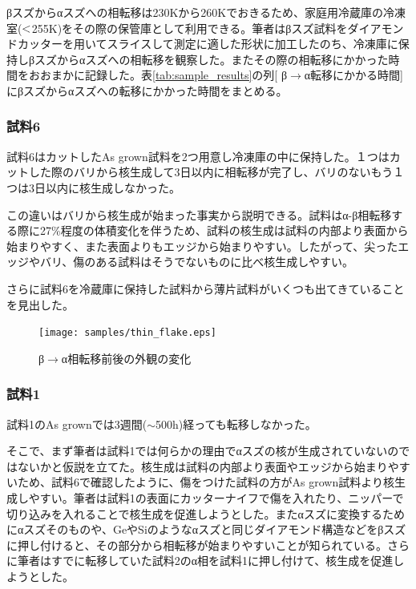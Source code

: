 βスズからαスズへの相転移は230Kから260Kでおきる\cite{Matvienko,Ogino,Cornelius}ため、家庭用冷蔵庫の冷凍室($\rm<$255K)をその際の保管庫として利用できる。筆者はβスズ試料をダイアモンドカッターを用いてスライスして測定に適した形状に加工したのち、冷凍庫に保持しβスズからαスズへの相転移を観察した。またその際の相転移にかかった時間をおおまかに記録した。表\ref{tab:sample_results}の列[ β$\to$α転移にかかる時間] にβスズからαスズへの転移にかかった時間をまとめる。

\subsubsection{試料6}
試料6はカットしたAs grown試料を2つ用意し冷凍庫の中に保持した。１つはカットした際のバリから核生成して3日以内に相転移が完了し、バリのないもう１つは3日以内に核生成しなかった。

この違いはバリから核生成が始まった事実から説明できる。試料はα-β相転移する際に27\%程度の体積変化を伴うため、試料の核生成は試料の内部より表面から始まりやすく、また表面よりもエッジから始まりやすい\cite{Cornelius}。したがって、尖ったエッジやバリ、傷のある試料はそうでないものに比べ核生成しやすい。

さらに試料6を冷蔵庫に保持した試料から薄片試料がいくつも出てきていることを見出した。
\begin{figure}[!h]
    \begin{center}
   \texttt{[image: samples/thin\_flake.eps]}
  \end{center}
  \caption{β$\to$α相転移前後の外観の変化}
  \label{fig:thin_flake}
\end{figure}


\subsubsection{試料1}
試料1のAs grownでは3週間($\sim$500h)経っても転移しなかった。

そこで、まず筆者は試料1では何らかの理由でαスズの核が生成されていないのではないかと仮説を立てた。核生成は試料の内部より表面やエッジから始まりやすい\cite{Cornelius}ため、試料6で確認したように、傷をつけた試料の方がAs grown試料より核生成しやすい。筆者は試料1の表面にカッターナイフで傷を入れたり、ニッパーで切り込みを入れることで核生成を促進しようとした。またαスズに変換するためにαスズそのものや、GeやSiのようなαスズと同じダイアモンド構造などをβスズに押し付けると、その部分から相転移が始まりやすいことが知られている\cite{Cornelius}。さらに筆者はすでに転移していた試料2のα相を試料1に押し付けて、核生成を促進しようとした。

